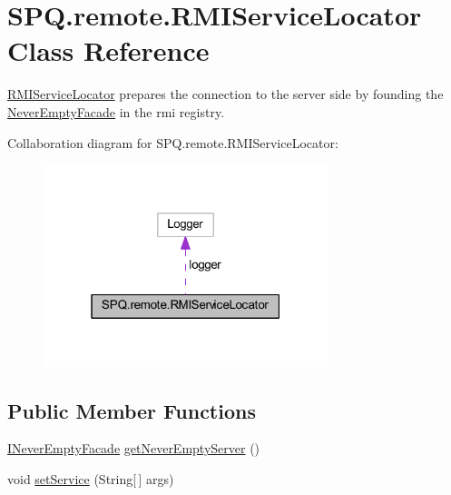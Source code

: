 \hypertarget{class_s_p_q_1_1remote_1_1_r_m_i_service_locator}{}\section{S\+P\+Q.\+remote.\+R\+M\+I\+Service\+Locator Class Reference}
\label{class_s_p_q_1_1remote_1_1_r_m_i_service_locator}


\mbox{\hyperlink{class_s_p_q_1_1remote_1_1_r_m_i_service_locator}{R\+M\+I\+Service\+Locator}} prepares the connection to the server side by founding the \mbox{\hyperlink{class_s_p_q_1_1remote_1_1_never_empty_facade}{Never\+Empty\+Facade}} in the rmi registry.  




Collaboration diagram for S\+P\+Q.\+remote.\+R\+M\+I\+Service\+Locator\+:
\nopagebreak
\begin{figure}[H]
\begin{center}
\leavevmode
\includegraphics[width=235pt]{class_s_p_q_1_1remote_1_1_r_m_i_service_locator__coll__graph}
\end{center}
\end{figure}
\subsection*{Public Member Functions}
\begin{DoxyCompactItemize}
\item 
\mbox{\hyperlink{interface_s_p_q_1_1remote_1_1_i_never_empty_facade}{I\+Never\+Empty\+Facade}} \mbox{\hyperlink{class_s_p_q_1_1remote_1_1_r_m_i_service_locator_a19d79d8b31c278a127bf921895d889ae}{get\+Never\+Empty\+Server}} ()
\item 
void \mbox{\hyperlink{class_s_p_q_1_1remote_1_1_r_m_i_service_locator_ae4d529073f4b435fa3d0fedcaad0fc70}{set\+Service}} (String\mbox{[}$\,$\mbox{]} args)
\end{DoxyCompactItemize}


